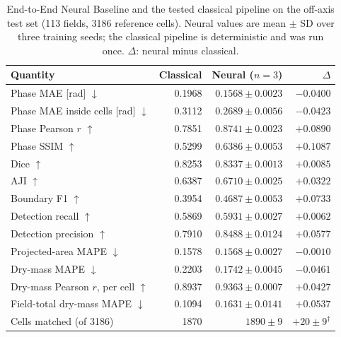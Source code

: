 \begin{table}[!htbp]
\centering
\caption{End-to-End Neural Baseline and the tested classical pipeline on the
off-axis test set (113 fields, 3186 reference cells). Neural values are mean
$\pm$ SD over three training seeds; the classical pipeline is deterministic and
was run once. $\Delta$: neural minus classical.}
\label{tab:learned-vs-classical}
\footnotesize
\begin{tabular*}{\textwidth}{@{\extracolsep{\fill}}lrrr@{}}
\toprule
Quantity & Classical & Neural ($n=3$) & $\Delta$ \\
\midrule
Phase MAE [rad] $\downarrow$ & 0.1968 & $0.1568 \pm 0.0023$ & $-0.0400$ \\
Phase MAE inside cells [rad] $\downarrow$ & 0.3112 & $0.2689 \pm 0.0056$ & $-0.0423$ \\
Phase Pearson $r$ $\uparrow$ & 0.7851 & $0.8741 \pm 0.0023$ & $+0.0890$ \\
Phase SSIM $\uparrow$ & 0.5299 & $0.6386 \pm 0.0053$ & $+0.1087$ \\
\midrule
Dice $\uparrow$ & 0.8253 & $0.8337 \pm 0.0013$ & $+0.0085$ \\
AJI $\uparrow$ & 0.6387 & $0.6710 \pm 0.0025$ & $+0.0322$ \\
Boundary F1 $\uparrow$ & 0.3954 & $0.4687 \pm 0.0053$ & $+0.0733$ \\
Detection recall $\uparrow$ & 0.5869 & $0.5931 \pm 0.0027$ & $+0.0062$ \\
Detection precision $\uparrow$ & 0.7910 & $0.8488 \pm 0.0124$ & $+0.0577$ \\
\midrule
Projected-area MAPE $\downarrow$ & 0.1578 & $0.1568 \pm 0.0027$ & $-0.0010$ \\
Dry-mass MAPE $\downarrow$ & 0.2203 & $0.1742 \pm 0.0045$ & $-0.0461$ \\
Dry-mass Pearson $r$, per cell $\uparrow$ & 0.8937 & $0.9363 \pm 0.0007$ & $+0.0427$ \\
Field-total dry-mass MAPE $\downarrow$ & 0.1094 & $0.1631 \pm 0.0141$ & $+0.0537$ \\
Cells matched (of 3186) & 1870 & $1890 \pm 9$ & $+20 \pm 9^{\dagger}$ \\
\bottomrule
\end{tabular*}
\end{table}
